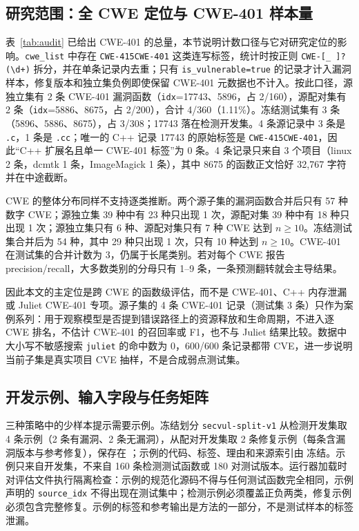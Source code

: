 \documentclass[conference]{IEEEtran}
\begin{document}
\subsection{研究范围：全 CWE 定位与 CWE-401 样本量}
\label{sec:scope-cwe}
表~\ref{tab:audit} 已给出 CWE-401 的总量，本节说明计数口径与它对研究定位的影响。\texttt{cwe\_list} 中存在 \texttt{CWE-415CWE-401} 这类连写标签，统计时按正则 \texttt{CWE-[\_ ]?(\textbackslash d+)} 拆分，并在单条记录内去重；只有 \texttt{is\_vulnerable=true} 的记录才计入漏洞样本，修复版本和独立集负例即使保留 CWE-401 元数据也不计入。按此口径，源独立集有 2 条 CWE-401 漏洞函数（\texttt{idx}=17743、5896，占 2/160），源配对集有 2 条（\texttt{idx}=5886、8675，占 2/200），合计 4/360（1.11\%）。冻结测试集有 3 条（5896、5886、8675），占 3/308；17743 落在检测开发集。4 条源记录中 3 条是 \texttt{.c}，1 条是 \texttt{.cc}；唯一的 C++ 记录 17743 的原始标签是 \texttt{CWE-415CWE-401}，因此“C++ 扩展名且单一 CWE-401 标签”为 0 条。4 条记录只来自 3 个项目（linux 2 条，dcmtk 1 条，ImageMagick 1 条），其中 8675 的函数正文恰好 32{,}767 字符并在中途截断。

CWE 的整体分布同样不支持逐类推断。两个源子集的漏洞函数合并后只有 57 种数字 CWE；源独立集 39 种中有 23 种只出现 1 次，源配对集 39 种中有 18 种只出现 1 次；源独立集只有 6 种、源配对集只有 7 种 CWE 达到 $n\ge 10$。冻结测试集合并后为 54 种，其中 29 种只出现 1 次，只有 10 种达到 $n\ge 10$。CWE-401 在测试集的合并计数为 3，仍属于长尾类别。若对每个 CWE 报告 precision/recall，大多数类别的分母只有 1--9 条，一条预测翻转就会主导结果。

因此本文的主定位是跨 CWE 的函数级评估，而不是 CWE-401、C++ 内存泄漏或 Juliet CWE-401 专项。源子集的 4 条 CWE-401 记录（测试集 3 条）只作为案例系列：用于观察模型是否提到错误路径上的资源释放和生命周期，不进入逐 CWE 排名，不估计 CWE-401 的召回率或 F1，也不与 Juliet 结果比较。数据中大小写不敏感搜索 \texttt{juliet} 的命中数为 0，600/600 条记录都带 CVE，进一步说明当前子集是真实项目 CVE 抽样，不是合成弱点测试集。

\subsection{开发示例、输入字段与任务矩阵}
三种策略中的少样本提示需要示例。冻结划分 \texttt{secvul-split-v1} 从检测开发集取 4 条示例（2 条有漏洞、2 条无漏洞），从配对开发集取 2 条修复示例（每条含漏洞版本与参考修复），保存在 ；示例的代码、标签、理由和来源索引由  冻结。示例只来自开发集，不来自 160 条检测测试函数或 180 对测试版本。运行器加载时对评估文件执行隔离检查：示例的规范化源码不得与任何测试函数完全相同，示例声明的 \texttt{source\_idx} 不得出现在测试集中；检测示例必须覆盖正负两类，修复示例必须包含完整修复。示例的标签和参考输出是方法的一部分，不是测试样本的标签泄漏。
\end{document}

